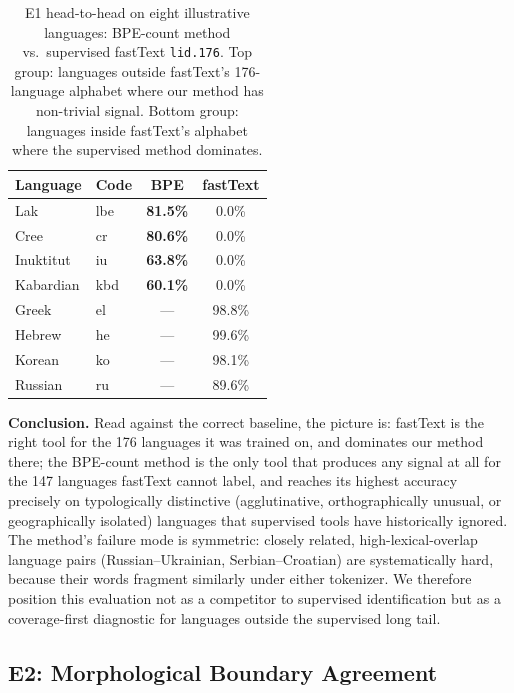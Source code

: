 \documentclass[11pt]{article}
\begin{document}
\begin{table}[ht]
\caption{E1 head-to-head on eight illustrative languages: BPE-count method vs.\ supervised fastText \texttt{lid.176}. Top group: languages outside fastText's 176-language alphabet where our method has non-trivial signal. Bottom group: languages inside fastText's alphabet where the supervised method dominates.}
\label{tab:e1_headline_langs}
\centering
\small
\begin{tabular}{llcc}
\toprule
\textbf{Language} & \textbf{Code} & \textbf{BPE} & \textbf{fastText} \\
\midrule
Lak            & lbe & \textbf{81.5\%} & 0.0\% \\
Cree           & cr  & \textbf{80.6\%} & 0.0\% \\
Inuktitut      & iu  & \textbf{63.8\%} & 0.0\% \\
Kabardian      & kbd & \textbf{60.1\%} & 0.0\% \\
\midrule
Greek          & el  & --- & 98.8\% \\
Hebrew         & he  & --- & 99.6\% \\
Korean         & ko  & --- & 98.1\% \\
Russian        & ru  & --- & 89.6\% \\
\bottomrule
\end{tabular}
\end{table}

\textbf{Conclusion.} Read against the correct baseline, the picture is:  fastText is the right tool for the 176 languages it was trained on, and dominates our method there; the BPE-count method is the only tool that produces any signal at all for the 147 languages fastText cannot label, and reaches its highest accuracy precisely on typologically distinctive (agglutinative, orthographically unusual, or geographically isolated) languages that supervised tools have historically ignored. The method's failure mode is symmetric: closely related, high-lexical-overlap language pairs (Russian--Ukrainian, Serbian--Croatian) are systematically hard, because their words fragment similarly under either tokenizer. We therefore position this evaluation not as a competitor to supervised identification but as a coverage-first diagnostic for languages outside the supervised long tail.

\subsection{E2: Morphological Boundary Agreement}
\label{sec:e2}
\end{document}
